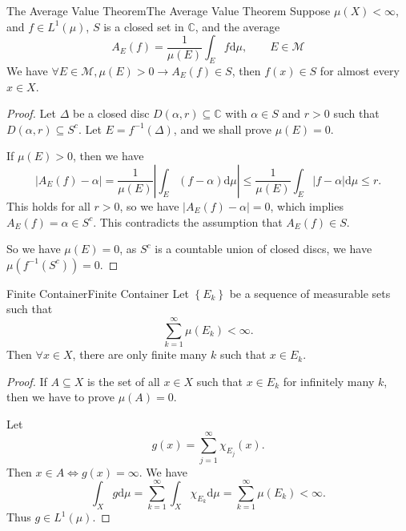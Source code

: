 \documentclass[../main.tex]{subfiles}
\begin{document}
\begin{theorem}{The Average Value Theorem}{The Average Value Theorem}
Suppose $\mu(X) < \infty $, and $f\in L^1(\mu)$, $S$ is a closed set in $\mathbb{C}$, and the average
\begin{equation*}
	A_E(f) = \frac{1}{\mu(E)} \int_E f \mathrm{d} \mu, \qquad E\in \mathcal{M}
\end{equation*}
We have $\forall E\in \mathcal{M}, \mu(E)>0 \rightarrow A_E(f)\in S$, then $f(x)\in S$ for almost every $x\in X$.
\end{theorem}
\begin{proof}
Let $\Delta$ be a closed disc $D(\alpha,r) \subseteq \mathbb{C}$ with $\alpha \in S$ and $r>0$ such that $D(\alpha,r) \subseteq S^c$. Let $E = f^{-1}(\Delta)$, and we shall prove $\mu(E) = 0$.

If $\mu(E) > 0$, then we have
\begin{equation*}
	\left|A_E(f) - \alpha\right| = \frac{1}{\mu(E)} \left|\int_E (f-\alpha) \mathrm{d} \mu\right| \leq \frac{1}{\mu(E)} \int_E \left|f-\alpha\right| \mathrm{d} \mu \leq  r.
\end{equation*}
This holds for all $r>0$, so we have $\left|A_E(f) - \alpha\right| = 0$, which implies $A_E(f) = \alpha \in S^c$. This contradicts the assumption that $A_E(f)\in S$.

So we have $\mu(E)=0$, as $S^c$ is a countable union of closed discs, we have $\mu(f^{-1}(S^c)) = 0$.
\end{proof}

\begin{theorem}{Finite Container}{Finite Container}
	Let $\left\{ E_k \right\}$ be a sequence of measurable sets such that
	\begin{equation*}
	\sum_{k=1}^{\infty } \mu(E_k) < \infty.
	\end{equation*}
	Then $\forall x\in X$, there are only finite many $k$ such that $x\in E_k$.
\end{theorem}
\begin{proof}
	If $A \subseteq X$ is the set of all $x\in X$ such that $x\in E_k$ for infinitely many $k$, then we have to prove $\mu(A)=0$.

	Let
	\begin{equation*}
		g(x) = \sum_{j=1}^{\infty } \chi_{E_j}(x).
	\end{equation*}
	Then $x\in A \Leftrightarrow g(x) = \infty $. We have
	\begin{equation*}
		\int_X g \mathrm{d} \mu = \sum_{k=1}^{\infty } \int_X \chi_{E_k} \mathrm{d} \mu = \sum_{k=1}^{\infty } \mu(E_k) < \infty.
	\end{equation*}
	Thus $g\in L^1(\mu)$.
\end{proof}
\end{document}

